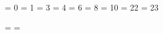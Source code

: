 %
%
%
%
%



\zremovePlaindef \strutbox
{}           %

\def \strut {%
  \relax
  \if \mathmodep
    \copy \strutbox
  \else
    \unhcopy \strutbox
  \fi}

\def \normalbaselines {%
  \baselineskip = \the\baselinemultiplier\normalbaselineskip
  \lineskiplimit = \normallineskiplimit
  \lineskip = \normallineskip}




\chardef \encoderoman         =  0      %
\chardef \encodeitalic        =  1      %
\chardef \encodemathitalic    =  3      %
\chardef \encodemathsymbol    =  4      %
\chardef \encodemathextended  =  6      %
\chardef \encodematharrow     =  8      %
\chardef \encodeother         = 10      %
\chardef \encodemono          = 22      %
\chardef \encodemonoitalic    = 23      %

\setlist \zfsizelist = {}
\setlist \zfstylelist = {}


\def \definetypestyle #1#2{%
  \append{#1}{\zfstylelist}%
  \zfwithfam{\zdeffam}{#1}%
  \zfwithmat{\def}{#1}{\zfl}{}%
  \zfwithmat{\xdef}{#1}{\zen}{#2}}

\def \definetypesize #1#2{%
  \append{#1}{\zfsizelist}%
  \zdefsize #1#2/%
  \zdefstrut #1#2/%
  \zfbldsize{#1}}

\def \zdefsize #1#2/#3/{%
  \zfwithmat{\xdef}{#1}{\zsz}{#2pt}}


